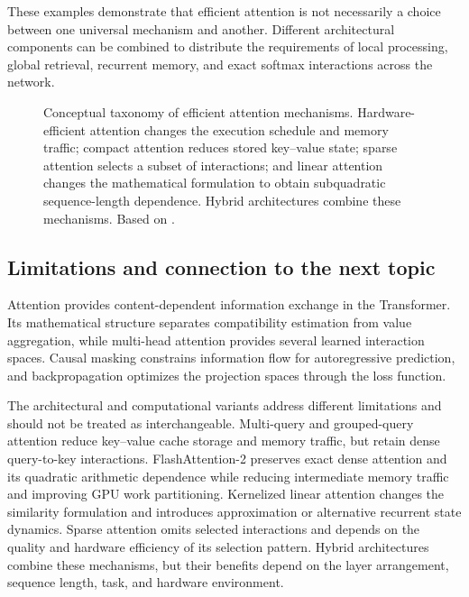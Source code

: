These examples demonstrate that efficient attention is not necessarily
a choice between one universal mechanism and another. Different
architectural components can be combined to distribute the requirements
of local processing, global retrieval, recurrent memory, and exact
softmax interactions across the network.

\begin{figure}[htbp]
    \centering
    
    \caption{Conceptual taxonomy of efficient attention mechanisms.
    Hardware-efficient attention changes the execution schedule and
    memory traffic; compact attention reduces stored key--value state;
    sparse attention selects a subset of interactions; and linear
    attention changes the mathematical formulation to obtain
    subquadratic sequence-length dependence. Hybrid architectures
    combine these mechanisms. Based on
    \textcite{sun2026efficientattention}.}
    \label{fig:attn-efficiency-taxonomy}
\end{figure}

\subsection{Limitations and connection to the next topic}
\label{subsec:attn-limitations-transition}

Attention provides content-dependent information exchange in the
Transformer. Its mathematical structure separates compatibility
estimation from value aggregation, while multi-head attention provides
several learned interaction spaces. Causal masking constrains information
flow for autoregressive prediction, and backpropagation optimizes the
projection spaces through the loss function.

The architectural and computational variants address different
limitations and should not be treated as interchangeable. Multi-query
and grouped-query attention reduce key--value cache storage and memory
traffic, but retain dense query-to-key interactions. FlashAttention-2
preserves exact dense attention and its quadratic arithmetic dependence
while reducing intermediate memory traffic and improving GPU work
partitioning. Kernelized linear attention changes the similarity
formulation and introduces approximation or alternative recurrent
state dynamics. Sparse attention omits selected interactions and
depends on the quality and hardware efficiency of its selection
pattern. Hybrid architectures combine these mechanisms, but their
benefits depend on the layer arrangement, sequence length, task, and
hardware environment.

